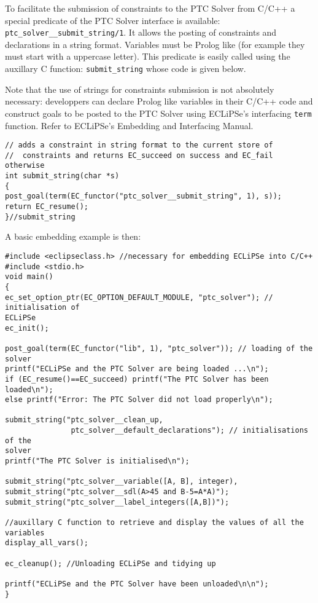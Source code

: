 \documentclass{article}
\begin{document}
To facilitate the submission of constraints to the PTC Solver from C/C++ a
special predicate of the PTC Solver interface is available:
\verb+ptc_solver__submit_string/1+. It allows the posting of constraints and
declarations in a string format. Variables must be Prolog like (for example they
must start with a uppercase letter). This predicate is easily called using the
auxillary C function: \verb+submit_string+ whose code is given below.

Note
that the use of strings for constraints submission is not absolutely necessary:
developpers can declare Prolog like variables in their C/C++ code and construct
goals to be posted to the PTC Solver using ECLiPSe's interfacing \verb+term+
function. Refer to ECLiPSe's Embedding and Interfacing Manual.

\begin{verbatim}
// adds a constraint in string format to the current store of
//  constraints and returns EC_succeed on success and EC_fail otherwise
int submit_string(char *s)
{
post_goal(term(EC_functor("ptc_solver__submit_string", 1), s));
return EC_resume();
}//submit_string
\end{verbatim}

A basic embedding example is then:

\begin{verbatim}
#include <eclipseclass.h> //necessary for embedding ECLiPSe into C/C++
#include <stdio.h>
void main()
{
ec_set_option_ptr(EC_OPTION_DEFAULT_MODULE, "ptc_solver"); // initialisation of
ECLiPSe
ec_init();

post_goal(term(EC_functor("lib", 1), "ptc_solver")); // loading of the solver
printf("ECLiPSe and the PTC Solver are being loaded ...\n");
if (EC_resume()==EC_succeed) printf("The PTC Solver has been loaded\n");
else printf("Error: The PTC Solver did not load properly\n");

submit_string("ptc_solver__clean_up,
               ptc_solver__default_declarations"); // initialisations of the
solver
printf("The PTC Solver is initialised\n");

submit_string("ptc_solver__variable([A, B], integer),
submit_string("ptc_solver__sdl(A>45 and B-5=A*A)");
submit_string("ptc_solver__label_integers([A,B])");

//auxillary C function to retrieve and display the values of all the variables
display_all_vars();

ec_cleanup(); //Unloading ECLiPSe and tidying up

printf("ECLiPSe and the PTC Solver have been unloaded\n\n");
}
\end{verbatim}
\end{document}
